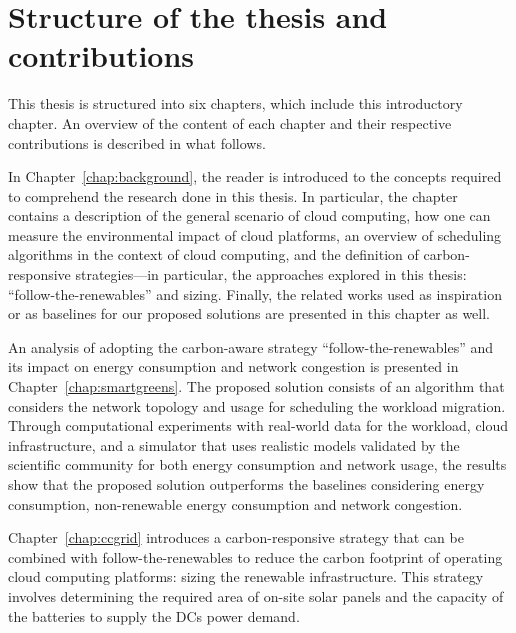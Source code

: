 \section{Structure of the thesis and contributions}

This thesis is structured into six chapters, which include this introductory chapter. An overview of the content of each chapter and their respective contributions is described in what follows.

In Chapter~\ref{chap:background}, the reader is introduced to the concepts required to comprehend the research done in this thesis. In particular, the chapter contains a description of the general scenario of cloud computing, how one can measure the environmental impact of cloud platforms, an overview of scheduling algorithms in the context of cloud computing, and the definition of carbon-responsive strategies---in particular, the approaches explored in this thesis: ``follow-the-renewables'' and sizing. Finally, the related works used as inspiration or as baselines for our proposed solutions are presented in this chapter as well.


An analysis of adopting the carbon-aware strategy ``follow-the-renewables'' and its impact on energy consumption and network congestion is presented in Chapter~\ref{chap:smartgreens}. The proposed solution consists of an algorithm that considers the network topology and usage for scheduling the workload migration. Through computational experiments with real-world data for the workload, cloud infrastructure, and a simulator that uses realistic models validated by the scientific community for both energy consumption and network usage, the results show that the proposed solution outperforms the baselines considering energy consumption, non-renewable energy consumption and network congestion.

Chapter~\ref{chap:ccgrid} introduces a carbon-responsive strategy that can be combined with follow-the-renewables to reduce the carbon footprint of operating cloud computing platforms: sizing the renewable infrastructure. This strategy involves determining the required area of on-site solar panels and the capacity of the batteries to supply the DCs power demand. 

